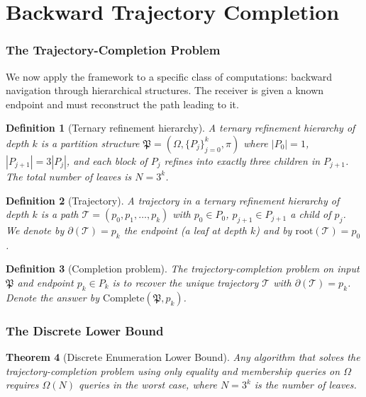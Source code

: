 \documentclass[twocolumn,a4paper]{article}
\newtheorem{theorem}{Theorem}[section]
\newtheorem{definition}[theorem]{Definition}
\newcommand{\PPart}{\mathfrak{P}}
\newcommand{\Trajec}{\mathcal{T}}
\newcommand{\Endp}{\partial}
\begin{document}
\part{Backward Trajectory Completion}

\section{The Trajectory-Completion Problem}
\label{sec:trajectory-problem}

We now apply the framework to a specific class of computations: backward navigation through hierarchical structures. The receiver is given a known endpoint and must reconstruct the path leading to it.

\begin{definition}[Ternary refinement hierarchy]
\label{def:ternary-hierarchy}
A \emph{ternary refinement hierarchy} of depth $k$ is a partition structure $\PPart=(\Omega,\{P_{j}\}_{j=0}^{k},\pi)$ where $|P_{0}|=1$, $|P_{j+1}|=3|P_{j}|$, and each block of $P_{j}$ refines into exactly three children in $P_{j+1}$. The total number of leaves is $N=3^{k}$.
\end{definition}

\begin{definition}[Trajectory]
\label{def:trajectory}
A \emph{trajectory} in a ternary refinement hierarchy of depth $k$ is a path $\Trajec=(p_{0},p_{1},\ldots,p_{k})$ with $p_{0}\in P_{0}$, $p_{j+1}\in P_{j+1}$ a child of $p_{j}$. We denote by $\Endp(\Trajec)=p_{k}$ the \emph{endpoint} (a leaf at depth $k$) and by $\mathrm{root}(\Trajec)=p_{0}$.
\end{definition}

\begin{definition}[Completion problem]
\label{def:completion-problem}
The \emph{trajectory-completion problem} on input $\PPart$ and endpoint $p_{k}\in P_{k}$ is to recover the unique trajectory $\Trajec$ with $\Endp(\Trajec)=p_{k}$. Denote the answer by $\mathrm{Complete}(\PPart,p_{k})$.
\end{definition}

\section{The Discrete Lower Bound}
\label{sec:discrete-lower}

\begin{theorem}[Discrete Enumeration Lower Bound]
\label{thm:discrete-lower}
Any algorithm that solves the trajectory-completion problem using only equality and membership queries on $\Omega$ requires $\Omega(N)$ queries in the worst case, where $N=3^{k}$ is the number of leaves.
\end{theorem}
\end{document}
